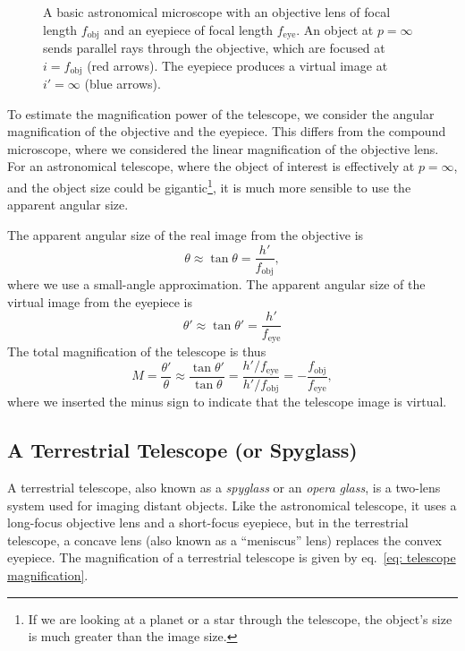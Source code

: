 \documentclass[addpoints]{physlabs}
\begin{document}
\begin{labsection}
\begin{theory}
    \begin{figure}[ht]
        \centering
        
        \caption{A basic astronomical microscope with an objective lens of focal length $f_\text{obj}$ and an eyepiece of focal length $f_\text{eye}$. An object at $p=\infty$ sends parallel rays through the objective, which are focused at $i=f_\text{obj}$ (red arrows). The eyepiece produces a virtual image at $i'=\infty$ (blue arrows).}
        \label{fig: astronomical telescope}
    \end{figure}

    To estimate the magnification power of the telescope, we consider the angular magnification of the objective and the eyepiece. This differs from the compound microscope, where we considered the linear magnification of the objective lens. For an astronomical telescope, where the object of interest is effectively at $p=\infty$, and the object size could be gigantic\footnote{If we are looking at a planet or a star through the telescope, the object's size is much greater than the image size.}, it is much more sensible to use the apparent angular size.

    The apparent angular size of the real image from the objective is
    \[
        \theta \approx \tan{\theta} = \frac{h'}{f_\text{obj}},
    \]
    where we use a small-angle approximation. The apparent angular size of the virtual image from the eyepiece is
    \[
        \theta' \approx \tan{\theta'} = \frac{h'}{f_\text{eye}}
    \]
    The total magnification of the telescope is thus
    \begin{equation}\label{eq: telescope magnification}
        M = \frac{\theta'}{\theta} 
        \approx \frac{\tan{\theta'}}{\tan{\theta}}
        = \frac{h'/f_\text{eye}}{h'/f_\text{obj}}
        = -\frac{f_\text{obj}}{f_\text{eye}},
    \end{equation}
    where we inserted the minus sign to indicate that the telescope image is virtual.

    \subsection*{A Terrestrial Telescope (or Spyglass)}

    A terrestrial telescope, also known as a \textsl{spyglass} or an \textsl{opera glass}, is a two-lens system used for imaging distant objects. Like the astronomical telescope, it uses a long-focus objective lens and a short-focus eyepiece, but in the terrestrial telescope, a concave lens (also known as a ``meniscus'' lens) replaces the convex eyepiece. The magnification of a terrestrial telescope is given by eq.~\ref{eq: telescope magnification}.


\end{theory}
\end{labsection}
\end{document}

